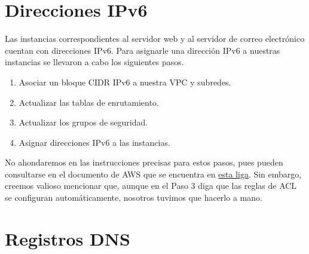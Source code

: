 \documentclass{article}
\begin{document}

\newpage
\section{Direcciones IPv6}

Las instancias correspondientes al servidor web y al
servidor de correo electr\'onico cuentan con direcciones
IPv6.   Para asignarle una direcci\'on IPv6 a nuestras
instancias se llevaron a cabo los siguientes pasos.
\begin{enumerate}
  \item Asociar un bloque CIDR IPv6 a nuestra VPC y
    subredes.

  \item Actualizar las tablas de enrutamiento.

  \item Actualizar los grupos de seguridad.

  \item Asignar direcciones IPv6 a las instancias.
\end{enumerate}

No ahondaremos en las instrucciones precisas para estos
pasos, pues pueden consultarse en el documento de AWS
que se encuentra en \href{https://docs.aws.amazon.com/vpc/latest/userguide/vpc-migrate-ipv6.html}{esta liga}.  Sin embargo,
creemos valioso mencionar que, aunque en el Paso 3 diga
que las reglas de ACL se configuran autom\'aticamente,
nosotros tuvimos que hacerlo a mano.


\newpage
\section{Registros DNS}
\label{sec:dns}
\end{document}
